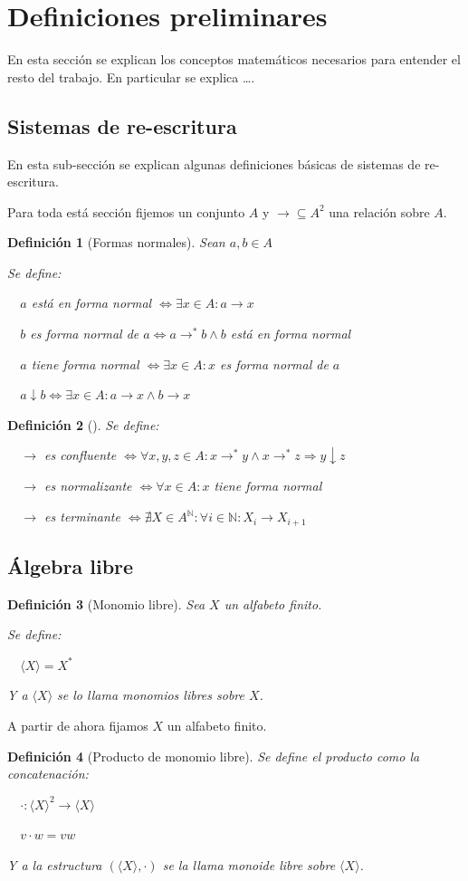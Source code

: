 \documentclass{amsbook}
\theoremstyle{customstyle}
\newtheorem{definition}{Definición}[section]
\newcommand{\definición}[2][]{
  \begin{definition}[#1]
  \setlength{\parindent}{2em} %
  #2
  \end{definition}
}
\begin{document}
\fontsize{16pt}{19pt}\selectfont %


\section{Definiciones preliminares}

En esta sección se explican los conceptos matemáticos necesarios para entender el resto del trabajo.
En particular se explica …. %

\subsection{Sistemas de re-escritura}

En esta sub-sección se explican algunas definiciones básicas de sistemas de re-escritura.

Para toda está sección fijemos un conjunto $A$ y $→ ⊆ A^2$ una relación sobre $A$.

\definición[Formas normales] {
Sean $a, b ∈ A$

Se define:

  $a$ está en forma normal $⇔ ∃x ∈ A : a → x$

  $b$ es forma normal de $a ⇔ a →^* b ∧ b$ está en forma normal

  $a$ tiene forma normal $⇔ ∃x ∈ A : x$ es forma normal de $a$

  $a ↓ b ⇔ ∃x ∈ A : a → x ∧ b → x$
}

\definición[] {


Se define:

  $→$ es confluente $⇔ ∀x, y, z ∈ A : x →^* y ∧ x →^*z ⇒ y ↓ z$

  $→$ es normalizante $⇔ ∀x ∈ A : x$ tiene forma normal

  $→$ es terminante $⇔ ∄X ∈ A^ℕ : ∀i ∈ ℕ : X_i → X_{i + 1}$
}


\subsection{Álgebra libre}

\definición[Monomio libre] {
Sea $X$ un alfabeto finito.

Se define:

  $⟨X⟩ = X^*$

Y a $⟨X⟩$ se lo llama monomios libres sobre $X$.
}

A partir de ahora fijamos $X$ un alfabeto finito.

\definición[Producto de monomio libre] {
Se define el producto como la concatenación:

  $· : ⟨X⟩^2 → ⟨X⟩$

  $v · w = vw$

Y a la estructura $(⟨X⟩, ·)$ se la llama monoide libre sobre $⟨X⟩$.
}
\end{document}
